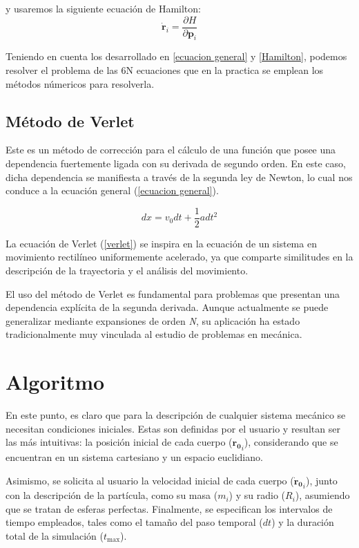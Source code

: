 y usaremos la siguiente ecuación de Hamilton:
\begin{equation}\label{Hamilton}
    \dot{\mathbf{r}}_i=\frac{\partial H}{\partial \mathbf{p}_i}
\end{equation}

Teniendo en cuenta los desarrollado en \ref{ecuacion general} y \ref{Hamilton}, podemos resolver el problema de las 6N ecuaciones que en la practica se emplean los métodos númericos para resolverla.



\subsection{Método de Verlet}
Este es un método de corrección para el cálculo de una función que posee una dependencia fuertemente ligada con su derivada de segundo orden. En este caso, dicha dependencia se manifiesta a través de la segunda ley de Newton, lo cual nos conduce a la ecuación general (\ref{ecuacion general}).

\begin{equation}\label{verlet}
    dx=v_0dt+\frac{1}{2}adt^2
\end{equation}

La ecuación de Verlet (\ref{verlet}) se inspira en la ecuación de un sistema en movimiento rectilíneo uniformemente acelerado, ya que comparte similitudes en la descripción de la trayectoria y el análisis del movimiento.

El uso del método de Verlet es fundamental para problemas que presentan una dependencia explícita de la segunda derivada. Aunque actualmente se puede generalizar mediante expansiones de orden \textit{N}, su aplicación ha estado tradicionalmente muy vinculada al estudio de problemas en mecánica.

\section{Algoritmo}
En este punto, es claro que para la descripción de cualquier sistema mecánico se necesitan condiciones iniciales. Estas son definidas por el usuario y resultan ser las más intuitivas: la posición inicial de cada cuerpo ($\mathbf{r_{0}}_i$), considerando que se encuentran en un sistema cartesiano y un espacio euclidiano.  

Asimismo, se solicita al usuario la velocidad inicial de cada cuerpo ($\mathbf{\dot{r}_{0}}_i$), junto con la descripción de la partícula, como su masa ($m_i$) y su radio ($R_i$), asumiendo que se tratan de esferas perfectas. Finalmente, se especifican los intervalos de tiempo empleados, tales como el tamaño del paso temporal ($dt$) y la duración total de la simulación ($t_{\text{max}}$).


